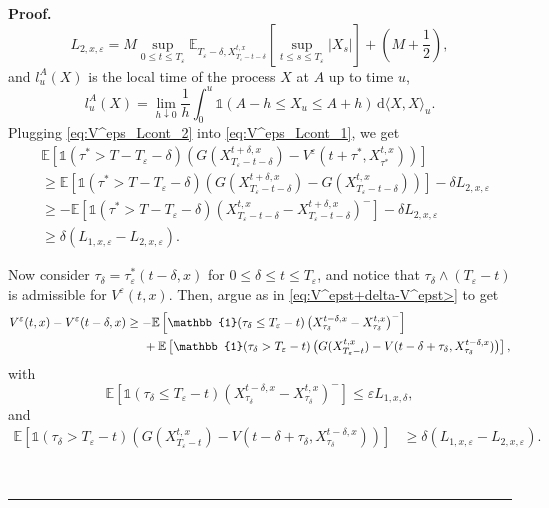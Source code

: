 \documentclass{tufte-handout}
\newcommand{\E}{\mathbb{E}} %
\newcommand{\dif}{\mathrm{d}}
\newenvironment{pf}[1][Proof]{\textbf{#1.} }{\ \rule{0.5em}{0.5em}}
\begin{document}
\begin{pf}
		$$
		L_{2, x, \varepsilon} = M\sup_{0\leq t\leq T_\varepsilon}\E_{T_\varepsilon - \delta, X_{T_\varepsilon - t - \delta}^{t, x}}\left[\sup_{t\leq s\leq T_\varepsilon}\left|X_{s}\right|\right] + \left(M + \frac{1}{2}\right),
		$$
		and $l_u^A(X)$ is the local time of the process $X$ at $A$ up to time $u$,
		$$
		l_u^A(X) = \lim_{h\downarrow 0} \frac{1}{h}\int_{0}^{u}\mathbb{1}(A - h \leq X_u \leq A + h)\,\dif \langle X, X\rangle_u.
		$$
		Plugging \eqref{eq:V^eps_Lcont_2} into \eqref{eq:V^eps_Lcont_1}, we get
		\begin{align}
		&\E\left[\mathbb{1}(\tau^* > T - T_\varepsilon - \delta)\left(G(X_{T_\varepsilon - t - \delta}^{t + \delta, x}) - V^{\varepsilon}(t + \tau^*, X_{\tau^*}^{t, x})\right)\right] \nonumber \\
		&\geq \E\left[\mathbb{1}(\tau^* > T - T_\varepsilon - \delta)\left(G(X_{T_\varepsilon - t - \delta}^{t + \delta, x}) - G(X_{T_\varepsilon - t - \delta}^{t, x})\right)\right] - \delta L_{2, x, \varepsilon} \nonumber \\ 
		&\geq - \E\left[\mathbb{1}(\tau^* > T - T_\varepsilon - \delta)\left(X_{T_\varepsilon - t - \delta}^{t, x} - X_{T_\varepsilon - t - \delta}^{t + \delta, x}\right)^-\right] - \delta L_{2, x, \varepsilon} \nonumber \\ 
		&\geq  \delta\left(L_{1, x, \varepsilon} - L_{2, x, \varepsilon}\right). \label{eq:V^eps_Lcont_3}
		\end{align}
		
		Now consider $\tau_\delta = \tau_\varepsilon^*(t - \delta, x)$ for $0 \leq \delta \leq t \leq T_\varepsilon$, and notice that $\tau_\delta\wedge(T_\varepsilon - t)$ is admissible for $V^{\varepsilon}(t, x)$. Then, argue as in \eqref{eq:V^epst+delta-V^epst>} to get
		\begin{align*}
		V^{\varepsilon}(t, x) - V^\varepsilon(t - \delta, x)
		&\geq -\E\left[\mathbb{1}(\tau_\delta\leq T_\varepsilon - t)\left(X_{\tau_\delta}^{t - \delta, x} - X_{\tau_\delta}^{t, x}\right)^-\right] \nonumber \\
		&\hspace{0.5cm} +\E\left[\mathbb{1}(\tau_\delta > T_\varepsilon - t)\left(G(X_{T_\varepsilon - t}^{t, x})  - V(t - \delta + \tau_\delta, X_{\tau_\delta}^{t - \delta, x})\right)\right],
		\end{align*}
		with
		$$
		\E\left[\mathbb{1}(\tau_\delta\leq T_\varepsilon - t)\left(X_{\tau_\delta}^{t - \delta, x} - X_{\tau_\delta}^{t, x}\right)^-\right] \leq \varepsilon L_{1, x, \delta},
		$$ 
		and
		\begin{align*}
		\E\left[\mathbb{1}(\tau_\delta > T_\varepsilon - t)\left(G(X_{T_\varepsilon - t}^{t, x})  - V(t - \delta + \tau_\delta, X_{\tau_\delta}^{t - \delta, x})\right)\right] &\geq  \delta\left(L_{1, x, \varepsilon} - L_{2, x, \varepsilon}\right).
		\end{align*}
		

\end{pf}
\end{document}
